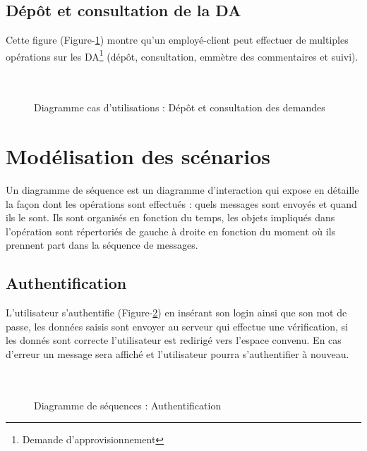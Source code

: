 \documentclass{report}
\begin{document}
\newpage
\subsection{Dépôt et consultation de la DA}
Cette figure (Figure-\ref{c}) montre qu’un employé-client peut effectuer de multiples opérations sur les DA\protect\footnote{Demande d'approvisionnement} (dépôt, consultation, emmètre des commentaires et suivi).\\\\\\
  \begin{figure}[h]
        \centering
        \caption{Diagramme cas d'utilisations : Dépôt et consultation des demandes}
        \label{c}
    \end{figure}

\newpage
\section{Modélisation des scénarios}
Un diagramme de séquence est un diagramme d’interaction qui expose en détaille la façon dont les opérations sont effectués : quels messages sont envoyés et quand ils le sont.
Ils sont organisés en fonction du temps, les objets impliqués dans l’opération sont répertoriés de gauche à droite en fonction du moment où ils prennent part dans la séquence de messages.

\subsection{Authentification}
L’utilisateur s’authentifie (Figure-\ref{d}) en insérant son login ainsi que son mot de passe, les données saisis sont envoyer au serveur qui effectue une vérification, si les donnés sont correcte l’utilisateur est redirigé vers l'espace convenu. En cas d’erreur un message sera affiché et l’utilisateur pourra s’authentifier à nouveau.\\\\\\
  \begin{figure}[h]
        \centering
        \caption{Diagramme de séquences : Authentification}
        \label{d}
    \end{figure}

\newpage
\end{document}
